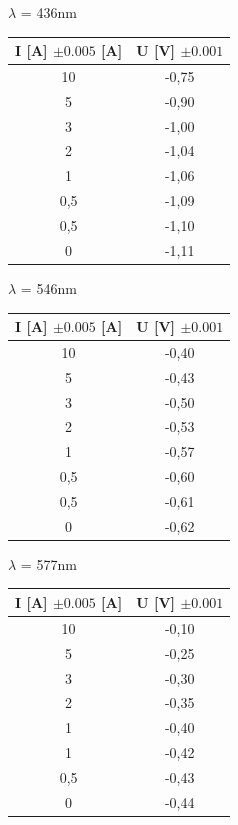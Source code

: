 \documentclass[a4paper]{report}
\begin{document}
\newpage

\noindent $\lambda$ = 436nm \\
\begin{center}
\begin{tabular}{ |c|c| } 
 \hline
 I [A] $\pm 0.005$ [A] & U [V] $\pm 0.001$\\
 \hline
    10    & -0,75 \\
    5     & -0,90 \\
    3     & -1,00 \\
    2     & -1,04 \\
    1     & -1,06 \\
    0,5   & -1,09 \\
    0,5   & -1,10 \\
    0     & -1,11 \\
\hline

\end{tabular}
\end{center}


\noindent $\lambda$ = 546nm \\
\begin{center}
\begin{tabular}{ |c|c| } 
 \hline
 I [A] $\pm 0.005$ [A] & U [V] $\pm 0.001$\\
 \hline
    10    & -0,40 \\
    5     & -0,43 \\
    3     & -0,50 \\
    2     & -0,53 \\
    1     & -0,57 \\
    0,5   & -0,60 \\
    0,5   & -0,61 \\
    0     & -0,62 \\
\hline

\end{tabular}
\end{center}


\noindent $\lambda$ = 577nm \\
\begin{center}
\begin{tabular}{ |c|c| } 
 \hline
 I [A] $\pm 0.005$ [A] & U [V] $\pm 0.001$\\
 \hline
    10    & -0,10 \\
    5     & -0,25 \\
    3     & -0,30 \\
    2     & -0,35 \\
    1     & -0,40 \\
    1     & -0,42 \\
    0,5   & -0,43 \\
    0     & -0,44 \\
\hline

\end{tabular}
\end{center}
\end{document}
